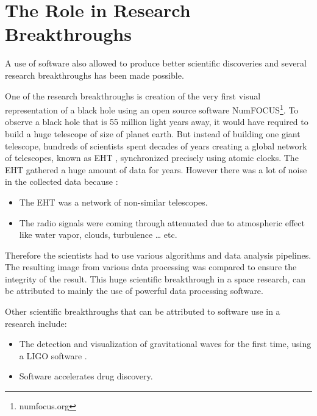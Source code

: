 %

\section{The Role in Research Breakthroughs  }
\label{sec:background:second_section}
A use of software also allowed to produce better scientific discoveries and several research breakthroughs has been made possible\citep{goble2014better}. 

One of the research breakthroughs is creation of the very first visual representation of a black hole using an open source software NumFOCUS\footnote{numfocus.org}. To observe a black hole that is 55 million light years away, it would have required to build a huge telescope of size of planet earth. But instead of building one giant telescope, hundreds of scientists spent decades of years creating a global network of telescopes, known as \ac{EHT} \citep{enwiki:1052167868}, synchronized precisely using atomic clocks. The \ac{EHT} gathered a huge amount of data for years. However there was a lot of noise in the collected data because :


\vspace{-1mm}   %
	\begin{itemize}%
		\item The \ac{EHT} was a network of non-similar telescopes.
		\item The radio signals were coming through attenuated due to atmospheric effect like water vapor, clouds, turbulence … etc.
	\end{itemize}
Therefore the scientists had to use various algorithms and data analysis pipelines. The resulting image from various data processing was compared to ensure the integrity of the result. This huge scientific breakthrough in a space research, can be attributed to mainly the use of powerful data processing software. 

Other scientific breakthroughs that can be attributed to software use in a research include:

	\vspace{-1mm}   %
	\begin{itemize}%
		\item The detection and visualization of gravitational waves for the first time, using a \ac{LIGO} software \citep{enwiki:1047100294, mukherji2017report}. 
		\item Software accelerates drug discovery\citep{bhati2021pandemic}.
	\end{itemize}


